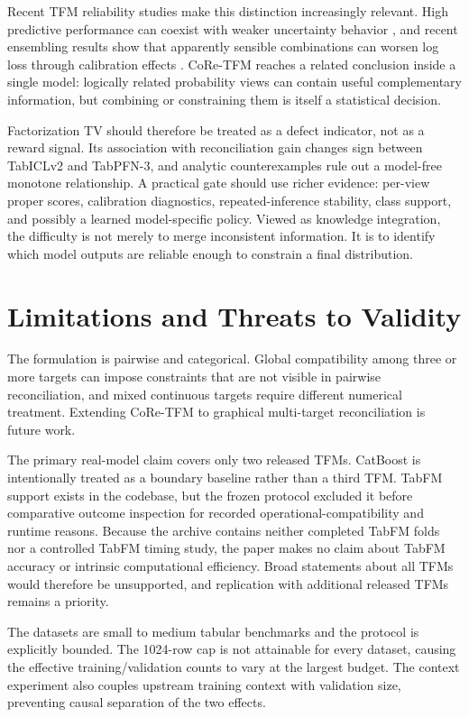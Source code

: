 \documentclass[a4paper,fleqn]{cas-sc}
\begin{document}
Recent TFM reliability studies make this distinction increasingly relevant. High predictive performance can coexist with weaker uncertainty behavior \citep{costa2026lowreliability,johnson2026uq}, and recent ensembling results show that apparently sensible combinations can worsen log loss through calibration effects \citep{tanna2026ensembling}. CoRe-TFM reaches a related conclusion inside a single model: logically related probability views can contain useful complementary information, but combining or constraining them is itself a statistical decision.

Factorization TV should therefore be treated as a defect indicator, not as a reward signal. Its association with reconciliation gain changes sign between TabICLv2 and TabPFN-3, and analytic counterexamples rule out a model-free monotone relationship. A practical gate should use richer evidence: per-view proper scores, calibration diagnostics, repeated-inference stability, class support, and possibly a learned model-specific policy. Viewed as knowledge integration, the difficulty is not merely to merge inconsistent information. It is to identify which model outputs are reliable enough to constrain a final distribution.

\section{Limitations and Threats to Validity}
The formulation is pairwise and categorical. Global compatibility among three or more targets can impose constraints that are not visible in pairwise reconciliation, and mixed continuous targets require different numerical treatment. Extending CoRe-TFM to graphical multi-target reconciliation is future work.

The primary real-model claim covers only two released TFMs. CatBoost is intentionally treated as a boundary baseline rather than a third TFM. TabFM support exists in the codebase, but the frozen protocol excluded it before comparative outcome inspection for recorded operational-compatibility and runtime reasons. Because the archive contains neither completed TabFM folds nor a controlled TabFM timing study, the paper makes no claim about TabFM accuracy or intrinsic computational efficiency. Broad statements about all TFMs would therefore be unsupported, and replication with additional released TFMs remains a priority.

The datasets are small to medium tabular benchmarks and the protocol is explicitly bounded. The 1024-row cap is not attainable for every dataset, causing the effective training/validation counts to vary at the largest budget. The context experiment also couples upstream training context with validation size, preventing causal separation of the two effects.
\end{document}
